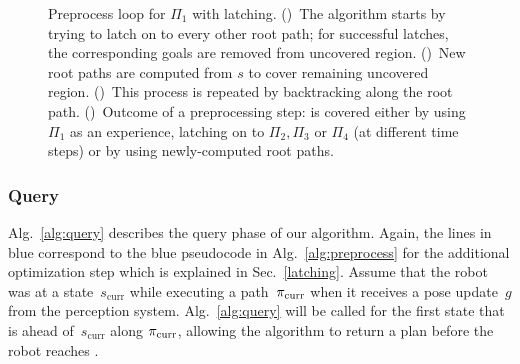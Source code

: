 \documentclass[a4paper]{report}
\begin{document}
\begin{figure*}[t]
    \centering
    \begin{subfigure}{.48\textwidth}
        \caption{}
        \label{fig:pl1}
    \end{subfigure}
    \begin{subfigure}{.48\textwidth}
        \caption{}
        \label{fig:pl2}
    \end{subfigure} 
    \begin{subfigure}{.48\textwidth}
        \caption{}
        \label{fig:pl3}
    \end{subfigure}
    \begin{subfigure}{.48\textwidth}
        \caption{}
        \label{fig:pl4}
    \end{subfigure}
    \caption{\CaptionTextSize
    Preprocess loop for $\Pi_1$ with latching.
    ()~The algorithm starts by trying to latch on to every other root path; for successful latches, the corresponding goals are removed from uncovered region.
    ()~New root paths are computed from $s$ to cover remaining uncovered region.
    ()~This process is repeated by backtracking along the root path.
    ()~Outcome of a preprocessing step: \Gfull is covered either by using $\Pi_1$ as an experience, 
    latching on to $\Pi_2,\Pi_3$ or  $\Pi_4$ (at different time steps)
    or by 
    using newly-computed root paths. 
    }
    \label{fig:pl_latching}
\end{figure*}

\subsubsection{Query}
Alg.~\ref{alg:query} describes the query phase of our algorithm. Again, the lines in blue correspond to the blue pseudocode in Alg.~\ref{alg:preprocess} for the additional optimization step which is explained in Sec.~\ref{latching}.
Assume that the robot was at a state~$s_{\textrm{curr}}$ while executing a path~$\pi_{\rm curr}$ when it receives a pose update~$g$ from the perception system. Alg.~\ref{alg:query} will be called for the first state \Sstart that is \Tbound ahead of~$s_{\textrm{curr}}$ along $\pi_{\rm curr}$, allowing the algorithm to return a plan before the robot reaches \Sstart.
\end{document}
